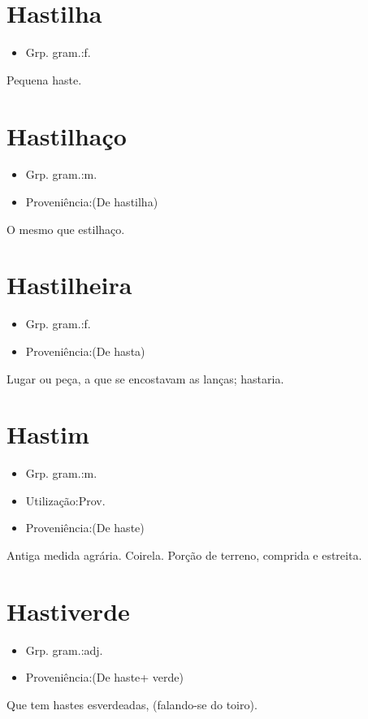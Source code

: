 \documentclass{article}
\begin{document}
\section{Hastilha}
\begin{itemize}
\item {Grp. gram.:f.}
\end{itemize}
Pequena haste.
\section{Hastilhaço}
\begin{itemize}
\item {Grp. gram.:m.}
\end{itemize}
\begin{itemize}
\item {Proveniência:(De \textunderscore hastilha\textunderscore )}
\end{itemize}
O mesmo que \textunderscore estilhaço\textunderscore .
\section{Hastilheira}
\begin{itemize}
\item {Grp. gram.:f.}
\end{itemize}
\begin{itemize}
\item {Proveniência:(De \textunderscore hasta\textunderscore )}
\end{itemize}
Lugar ou peça, a que se encostavam as lanças; hastaria.
\section{Hastim}
\begin{itemize}
\item {Grp. gram.:m.}
\end{itemize}
\begin{itemize}
\item {Utilização:Prov.}
\end{itemize}
\begin{itemize}
\item {Proveniência:(De \textunderscore haste\textunderscore )}
\end{itemize}
Antiga medida agrária.
Coirela.
Porção de terreno, comprida e estreita.
\section{Hastiverde}
\begin{itemize}
\item {Grp. gram.:adj.}
\end{itemize}
\begin{itemize}
\item {Proveniência:(De \textunderscore haste\textunderscore  + \textunderscore verde\textunderscore )}
\end{itemize}
Que tem hastes esverdeadas, (falando-se do toiro).
\end{document}
